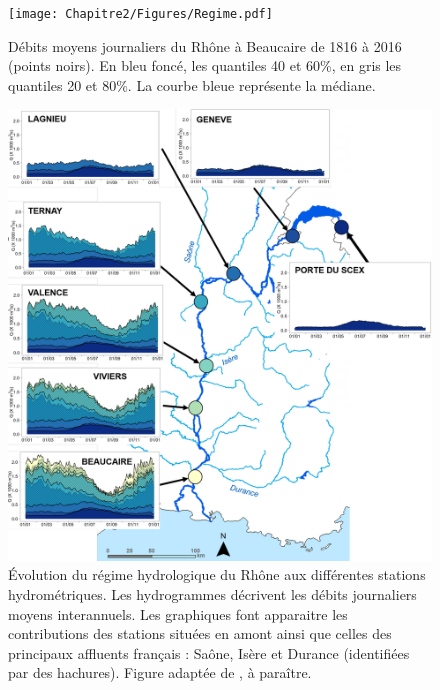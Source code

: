 	\begin{figure}[h!]
	\centering
		\texttt{[image: Chapitre2/Figures/Regime.pdf]}
        \caption{Débits moyens journaliers du Rhône à Beaucaire de 1816 à 2016 (points noirs). En bleu foncé, les quantiles 40 et 60\%, en gris les quantiles 20 et 80\%. La courbe bleue représente la médiane.}	
		\label{fig:Regime}
	\end{figure}
	
	
	\begin{figure}[h!]
	\centering
		\includegraphics[width=.6\linewidth]{Chapitre2/Figures/RégimeRhône.pdf}
        \caption{Évolution du régime hydrologique du Rhône aux différentes stations hydrométriques. Les hydrogrammes décrivent les débits journaliers moyens interannuels. Les graphiques font apparaitre les contributions des stations situées en amont ainsi que celles des principaux affluents français : Saône, Isère et Durance (identifiées par des hachures). Figure adaptée de \cite{le_coz_flux_nodate}, à paraître.}	
		\label{fig:BV}
	\end{figure}

